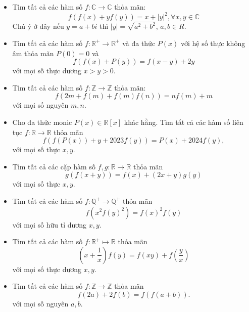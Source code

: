 \documentclass[11pt]{scrartcl}
\begin{document}
\begin{itemize}[label=, leftmargin=0em, itemsep=0.5em]
    \item \begin{btvn}
        Tìm tất cả các hàm số $f: \mathbb{C} \to \mathbb{C}$ thỏa mãn:
        \[
            f(f(x) + yf(y)) = x + |y|^2, \forall x,y \in \mathbb{C}
        \]
        Chú ý ở đây nếu $y = a + bi$ thì $|y| = \sqrt{a^2 + b^2}$, $a,b \in R$.
    \end{btvn}
    \item \begin{btvn}
        Tìm tất cả các hàm số $f : \mathbb{R}^+ \to \mathbb{R}^+$ và đa thức $P(x)$ với hệ số thực không âm thỏa mãn $P(0) = 0$ và \[f(f(x) + P(y)) = f(x - y) + 2y\] với mọi số thực dương $x > y > 0$.
    \end{btvn}
    \item \begin{btvn} Tìm tất cả các hàm số $f:\mathbb{Z}\to \mathbb{Z}$ thỏa mãn:
        \[ f(2m+f(m)+f(m)f(n))=nf(m)+m \]
    với mọi số nguyên $m,n$.
    \end{btvn}
    \item \begin{btvn}Cho đa thức monic $P(x) \in \mathbb{R}[x]$ khác hằng. Tìm tất cả các hàm số liên tục $f: \mathbb{R} \to \mathbb{R}$ thỏa mãn
        $$f(f(P(x))+y+2023f(y))=P(x)+2024f(y),$$
        với mọi số thực $x,y$.
    \end{btvn}

    \item \begin{btvn}
        Tìm tất cả các cặp hàm số $f,g: \mathbb{R} \to \mathbb{R}$ thỏa mãn
        \[g(f(x+y)) = f(x) + (2x + y)g(y)\]
        với mọi số thực $x,y$.
    \end{btvn}


    \item \begin{btvn}
        Tìm tất cả các hàm số $f: \mathbb{Q}^+ \to \mathbb{Q}^+$ thỏa mãn
        $$f(x^2f(y)^2)=f(x)^2f(y)$$
        với mọi số hữu tỉ dương $x,y$.
    \end{btvn}

    \item \begin{btvn}
        Tìm tất cả các hàm số $f : \mathbb{R}^+ \mapsto \mathbb{R}$ thỏa mãn
        $$\left(x+\frac{1}{x}\right)f(y)=f(xy)+f\left(\frac{y}{x}\right)$$
        với mọi số thực dương $x,y$.
    \end{btvn}
    \item \begin{btvn}
        Tìm tất cả các hàm số $f: \mathbb{Z} \to \mathbb{Z}$ thỏa mãn
        $$f(2a)+2f(b)=f(f(a+b)).$$
        với mọi số nguyên $a,b$.
    \end{btvn}


\end{itemize}
\end{document}
